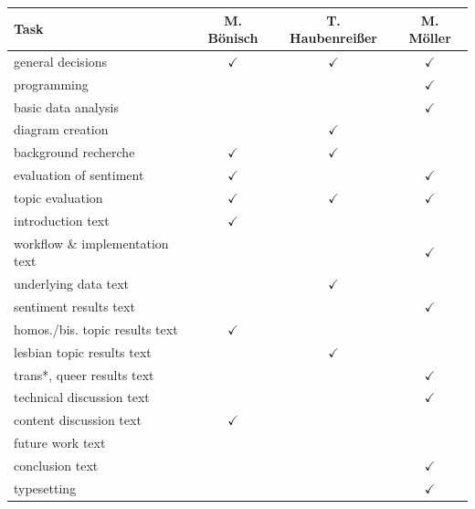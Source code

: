 \documentclass[10pt,a4paper,twocolumn]{scrartcl}
\begin{document}
\renewcommand{\arraystretch}{1.5}
\begin{center}
\begin{tabular}{lccc}
\toprule
Task		& M. Bönisch & T. Haubenreißer & M. Möller\\
\midrule
general decisions & $\checkmark$ & $\checkmark$ & $\checkmark$\\
programming & & & $\checkmark$\\
basic data analysis  & & & $\checkmark$\\
diagram creation  & & $\checkmark$ &\\
background recherche & $\checkmark$ & $\checkmark$ & \\
evaluation of sentiment & $\checkmark$ & & $\checkmark$\\
topic evaluation & $\checkmark$ & $\checkmark$ & $\checkmark$\\
introduction text & $\checkmark$ & & \\
workflow \& implementation text & & & $\checkmark$\\
underlying data text & & $\checkmark$ &\\
sentiment results text & & & $\checkmark$\\
homos./bis. topic results text & $\checkmark$ & & \\
lesbian topic results text & & $\checkmark$ & \\
trans*, queer results text & & & $\checkmark$\\
technical discussion text & & & $\checkmark$\\
content discussion text & $\checkmark$ & &\\
future work text\\
conclusion text & & & $\checkmark$\\
typesetting  & & & $\checkmark$\\
\bottomrule
\end{tabular}
\end{center}
\renewcommand{\arraystretch}{1}
\end{document}
